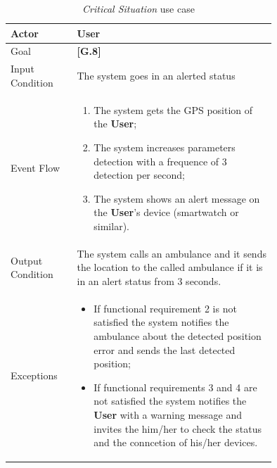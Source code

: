 \begin{center}
\begin{table}
\begin{tabular}{ | l | p{0.75\linewidth} | }
  \hline
    Actor & \textbf{User} \\ \hline
    Goal & \textbf{[G.8]} \\ \hline
    Input Condition & The system goes in an alerted status \\ \hline
    Event Flow & \begin{minipage}[t]{0.7\textwidth}
      \begin{enumerate}
        \item The system gets the GPS position of the \textbf{User};
        \item The system increases parameters detection with a frequence of 3 detection per second;
        \item The system shows an alert message on the \textbf{User}'s device (smartwatch or similar).
      \end{enumerate}
    \smallskip
  \end{minipage} \\ \hline
  Output Condition & The system calls an ambulance and it sends the location to the called ambulance if it is in an alert status from 3 seconds. \\ \hline
  Exceptions & \begin{minipage}[t]{0.7\textwidth}
    \begin{itemize}
      \smallskip
      \item If functional requirement 2 is not satisfied the system notifies the ambulance about the detected position error and sends the last detected position;
      \item If functional requirements 3 and 4 are not satisfied the system notifies the \textbf{User} with a warning message and invites the him/her to check the status and the conncetion of his/her devices.
    \end{itemize}
    \smallskip
  \end{minipage}  \\ \hline
\end{tabular}
\caption{\textit{Critical Situation} use case}
\label{table:criticalSituation}
\end{table}
\end{center}

